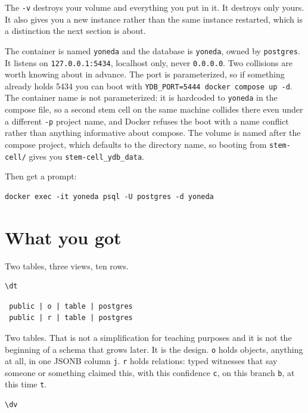 The \verb|-v| destroys your volume and everything you put in it. It destroys only yours. It also gives you a new instance rather than the same instance restarted, which is a distinction the next section is about.

The container is named \verb|yoneda| and the database is \verb|yoneda|, owned by \verb|postgres|. It listens on \verb|127.0.0.1:5434|, localhost only, never \verb|0.0.0.0|. Two collisions are worth knowing about in advance. The port is parameterized, so if something already holds 5434 you can boot with \verb|YDB_PORT=5444 docker compose up -d|. The container name is not parameterized: it is hardcoded to \verb|yoneda| in the compose file, so a second stem cell on the same machine collides there even under a different \verb|-p| project name, and Docker refuses the boot with a name conflict rather than anything informative about compose. The volume is named after the compose project, which defaults to the directory name, so booting from \verb|stem-cell/| gives you \verb|stem-cell_ydb_data|.

Then get a prompt:

\begin{verbatim}
docker exec -it yoneda psql -U postgres -d yoneda
\end{verbatim}

\section{What you got}

Two tables, three views, ten rows.

\begin{verbatim}
\dt
\end{verbatim}

\begin{verbatim}
 public | o | table | postgres
 public | r | table | postgres
\end{verbatim}

Two tables. That is not a simplification for teaching purposes and it is not the beginning of a schema that grows later. It is the design. \verb|o| holds objects, anything at all, in one JSONB column \verb|j|. \verb|r| holds relations: typed witnesses that say someone or something claimed this, with this confidence \verb|c|, on this branch \verb|b|, at this time \verb|t|.

\begin{verbatim}
\dv
\end{verbatim}


